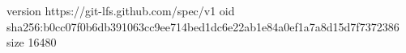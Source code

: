 version https://git-lfs.github.com/spec/v1
oid sha256:b0cc07f0b6db391063cc9ee714bed1dc6e22ab1e84a0ef1a7a8d15d7f7372386
size 16480
